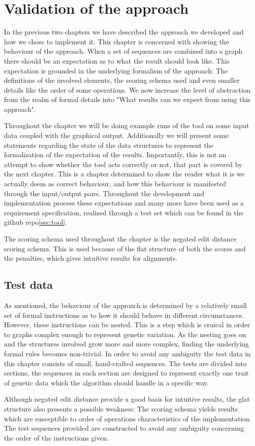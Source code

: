\documentclass[thesis.tex]{subfiles}
\begin{document}
\chapter{Validation of the approach}
In the previous two chapters we have described the approach we developed and how we chose to implement it. This chapter is concerned with showing the behaviour of the approach. When a set of sequences are combined into a graph there should be an expectation as to what the result should look like. This expectation is grounded in the underlying formalism of the approach: The definitions of the involved elements, the scoring schema used and even smaller details like the order of some operations. We now increase the level of abstraction from the realm of formal details into "What results can we expect from using this approach".\\
\par\noindent
Throughout the chapter we will be doing example runs of the tool on some input data coupled with the graphical output. Additionally we will present some statements regarding the state of the data structures to represent the formalization of the expectation of the results. Importantly, this is not an attempt to show whether the tool acts correctly or not, that part is covered by the next chapter. This is a chapter determined to show the reader what it is we actually deem as correct behaviour, and how this behaviour is manifested through the input/output pairs. Throughout the development and implementation process these expectations and many more have been used as a requirement specification, realized through a test set which can be found in the github repo\ref{sec:tool}.\\
\par\noindent
The scoring schema used throughout the chapter is the negated edit distance scoring schema. This is used because of the flat structure of both the scores and the penalties, which gives intuitive results for alignments. 
\section{Test data}
As mentioned, the behaviour of the approach is determined by a relatively small set of formal instructions as to how it should behave in different circumstances. However, these instructions can be nested. This is a step which is cruical in order to graphs complex enough to represent genetic variation. As the nesting goes on and the structures involved grow more and more complex, finding the underlying formal rules becomes non-trivial. In order to avoid any ambiguity the test data in this chapter consists of small, hand-crafted sequences. The tests are divided into sections, the sequences in each section are designed to represent exactly one trait of genetic data which the algorithm should handle in a specific way.\\
\par\noindent
Although negated edit distance provide a good basis for intuitive results, the glat structure also presents a possible weakness: The scoring schema yields results which are susceptible to order of operations characteristics of the implementation. The test sequences provided are constructed to avoid any ambiguity concerning the order of the instructions given.
\end{document}
